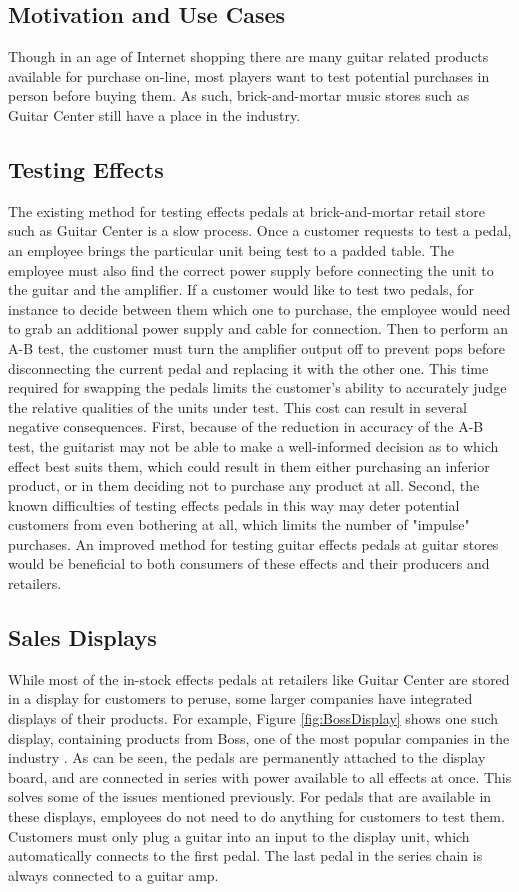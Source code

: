 \documentclass{article}
\begin{document}
	\subsection{Motivation and Use Cases}

	\color{gray}
	Though in an age of Internet shopping there are many guitar related products available for purchase on-line, most players want to test potential purchases in person before buying them.  As such, brick-and-mortar music stores such as Guitar Center still have a place in the industry.
	\subsection{Testing Effects}
	The existing method for testing effects pedals at brick-and-mortar retail store such as Guitar Center is a slow process.  Once a customer requests to test a pedal, an employee brings the particular unit being test to a padded table.  The employee must also find the correct power supply before connecting the unit to the guitar and the amplifier.  If a customer would like to test two pedals, for instance to decide between them which one to purchase, the employee would need to grab an additional power supply and cable for connection.  Then to perform an A-B test, the customer must turn the amplifier output off to prevent pops before disconnecting the current pedal and replacing it with the other one.  This time required for swapping the pedals limits the customer's ability to accurately judge the relative qualities of the units under test.  This cost can result in several negative consequences.  First, because of the reduction in accuracy of the A-B test, the guitarist may not be able to make a well-informed decision as to which effect best suits them, which could result in them either purchasing an inferior product, or in them deciding not to purchase any product at all.  Second, the known difficulties of testing effects pedals in this way may deter potential customers from even bothering at all, which limits the number of "impulse" purchases.  An improved method for testing guitar effects pedals at guitar stores would be beneficial to both consumers of these effects and their producers and retailers.

	\subsection{Sales Displays}
	While most of the in-stock effects pedals at retailers like Guitar Center are stored in a display for customers to peruse, some larger companies have integrated displays of their products.  For example, Figure \ref{fig:BossDisplay} shows one such display, containing products from Boss, one of the most popular companies in the industry \cite{ReverbMostPopular}.  As can be seen, the pedals are permanently attached to the display board, and are connected in series with power available to all effects at once.  This solves some of the issues mentioned previously.  For pedals that are available in these displays, employees do not need to do anything for customers to test them.  Customers must only plug a guitar into an input to the display unit, which automatically connects to the first pedal.  The last pedal in the series chain is always connected to a guitar amp.
\end{document}

